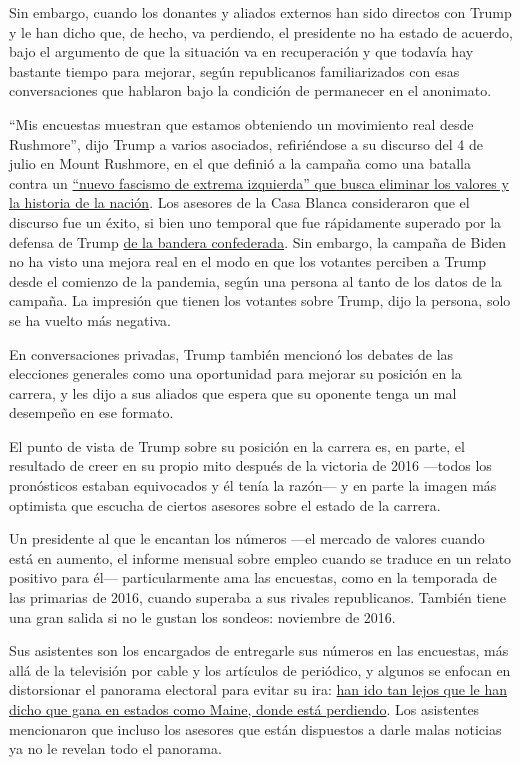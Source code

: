 Sin embargo, cuando los donantes y aliados externos han sido directos
con Trump y le han dicho que, de hecho, va perdiendo, el presidente no
ha estado de acuerdo, bajo el argumento de que la situación va en
recuperación y que todavía hay bastante tiempo para mejorar, según
republicanos familiarizados con esas conversaciones que hablaron bajo la
condición de permanecer en el anonimato.

``Mis encuestas muestran que estamos obteniendo un movimiento real desde
Rushmore'', dijo Trump a varios asociados, refiriéndose a su discurso
del 4 de julio en Mount Rushmore, en el que definió a la campaña como
una batalla contra un
\href{https://www.nytimes.com/2020/07/03/us/politics/trump-coronavirus-mount-rushmore.html}{``nuevo
fascismo de extrema izquierda'' que busca eliminar los valores y la
historia de la nación}. Los asesores de la Casa Blanca consideraron que
el discurso fue un éxito, si bien uno temporal que fue rápidamente
superado por la defensa de Trump
\href{https://www.nytimes.com/2020/07/06/us/politics/trump-bubba-wallace-nascar.html}{de
la bandera confederada}. Sin embargo, la campaña de Biden no ha visto
una mejora real en el modo en que los votantes perciben a Trump desde el
comienzo de la pandemia, según una persona al tanto de los datos de la
campaña. La impresión que tienen los votantes sobre Trump, dijo la
persona, solo se ha vuelto más negativa.

En conversaciones privadas, Trump también mencionó los debates de las
elecciones generales como una oportunidad para mejorar su posición en la
carrera, y les dijo a sus aliados que espera que su oponente tenga un
mal desempeño en ese formato.

El punto de vista de Trump sobre su posición en la carrera es, en parte,
el resultado de creer en su propio mito después de la victoria de 2016
---todos los pronósticos estaban equivocados y él tenía la razón--- y en
parte la imagen más optimista que escucha de ciertos asesores sobre el
estado de la carrera.

Un presidente al que le encantan los números ---el mercado de valores
cuando está en aumento, el informe mensual sobre empleo cuando se
traduce en un relato positivo para él--- particularmente ama las
encuestas, como en la temporada de las primarias de 2016, cuando
superaba a sus rivales republicanos. También tiene una gran salida si no
le gustan los sondeos: noviembre de 2016.

Sus asistentes son los encargados de entregarle sus números en las
encuestas, más allá de la televisión por cable y los artículos de
periódico, y algunos se enfocan en distorsionar el panorama electoral
para evitar su ira:
\href{https://www.nytimes.com/2020/07/02/us/politics/trump-2020-campaign-problems.html}{han
ido tan lejos que le han dicho que gana en estados como Maine, donde
está perdiendo}. Los asistentes mencionaron que incluso los asesores que
están dispuestos a darle malas noticias ya no le revelan todo el
panorama.

